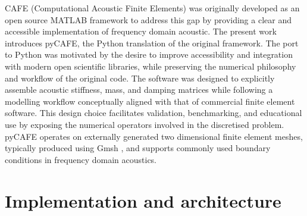 \documentclass{jors}
\begin{document}
CAFE (Computational Acoustic Finite Elements) \cite{Fabbri2025} was originally developed as an open source MATLAB framework to address this gap by providing a clear and accessible implementation of frequency domain acoustic. The present work introduces pyCAFE, the Python translation of the original framework. The port to Python was motivated by the desire to improve accessibility and integration with modern open scientific libraries, while preserving the numerical philosophy and workflow of the original code.
The software was designed to explicitly assemble acoustic stiffness, mass, and damping matrices while following a modelling workflow conceptually aligned with that of commercial finite element software. This design choice facilitates validation, benchmarking, and educational use by exposing the numerical operators involved in the discretised problem. pyCAFE operates on externally generated two dimensional finite element meshes, typically produced using Gmsh \cite{Gmsh2009}, and supports commonly used boundary conditions in frequency domain acoustics.




\section*{Implementation and architecture}
\end{document}
